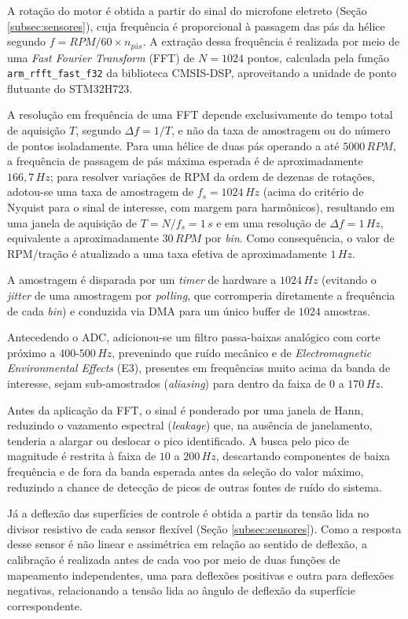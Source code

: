 A rotação do motor é obtida a partir do sinal do microfone eletreto (Seção \ref{subsec:sensores}), cuja frequência é proporcional à passagem das pás da hélice segundo $f = RPM/60 \times n_{pás}$. A extração dessa frequência é realizada por meio de uma \textit{Fast Fourier Transform} (FFT) de $N=1024$ pontos, calculada pela função \texttt{arm\_rfft\_fast\_f32} da biblioteca CMSIS-DSP, aproveitando a unidade de ponto flutuante do STM32H723.

A resolução em frequência de uma FFT depende exclusivamente do tempo total de aquisição $T$, segundo $\Delta f = 1/T$, e não da taxa de amostragem ou do número de pontos isoladamente. Para uma hélice de duas pás operando a até $5000\,RPM$, a frequência de passagem de pás máxima esperada é de aproximadamente $166{,}7\,Hz$; para resolver variações de RPM da ordem de dezenas de rotações, adotou-se uma taxa de amostragem de $f_s = 1024\,Hz$ (acima do critério de Nyquist para o sinal de interesse, com margem para harmônicos), resultando em uma janela de aquisição de $T = N/f_s = 1\,s$ e em uma resolução de $\Delta f = 1\,Hz$, equivalente a aproximadamente $30\,RPM$ por \textit{bin}. Como consequência, o valor de RPM/tração é atualizado a uma taxa efetiva de aproximadamente $1\,Hz$.

A amostragem é disparada por um \textit{timer} de hardware a $1024\,Hz$ (evitando o \textit{jitter} de uma amostragem por \textit{polling}, que corromperia diretamente a frequência de cada \textit{bin}) e conduzida via DMA para um único buffer de $1024$ amostras.

Antecedendo o ADC, adicionou-se um filtro passa-baixas analógico com corte próximo a $400$-$500\,Hz$, prevenindo que ruído mecânico e de \textit{Electromagnetic Environmental Effects} (E3), presentes em frequências muito acima da banda de interesse, sejam sub-amostrados (\textit{aliasing}) para dentro da faixa de $0$ a $170\,Hz$.

Antes da aplicação da FFT, o sinal é ponderado por uma janela de Hann, reduzindo o vazamento espectral (\textit{leakage}) que, na ausência de janelamento, tenderia a alargar ou deslocar o pico identificado. A busca pelo pico de magnitude é restrita à faixa de $10$ a $200\,Hz$, descartando componentes de baixa frequência e de fora da banda esperada antes da seleção do valor máximo, reduzindo a chance de detecção de picos de outras fontes de ruído do sistema.

Já a deflexão das superfícies de controle é obtida a partir da tensão lida no divisor resistivo de cada sensor flexível (Seção \ref{subsec:sensores}). Como a resposta desse sensor é não linear e assimétrica em relação ao sentido de deflexão, a calibração é realizada antes de cada voo por meio de duas funções de mapeamento independentes, uma para deflexões positivas e outra para deflexões negativas, relacionando a tensão lida ao ângulo de deflexão da superfície correspondente.

